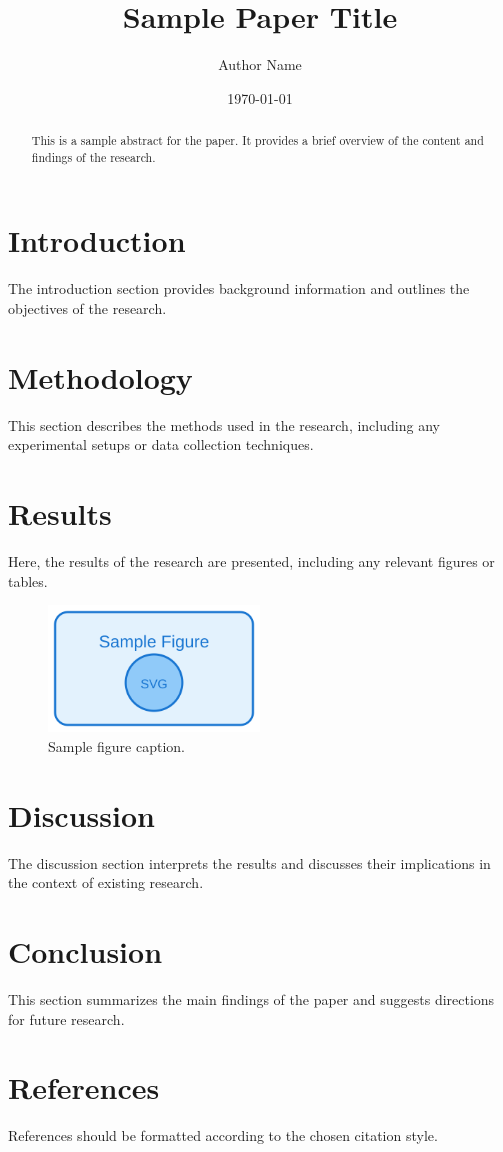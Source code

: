 \documentclass{article}
\title{Sample Paper Title}
\author{Author Name}
\date{\today}
\begin{document}
\maketitle

\begin{abstract}
This is a sample abstract for the paper. It provides a brief overview of the content and findings of the research.
\end{abstract}

\section{Introduction}
The introduction section provides background information and outlines the objectives of the research.

\section{Methodology}
This section describes the methods used in the research, including any experimental setups or data collection techniques.

\section{Results}
Here, the results of the research are presented, including any relevant figures or tables.

\begin{figure}[h]
    \centering
    \includegraphics[width=0.5\textwidth]{../static/img/sample-figure.svg}
    \caption{Sample figure caption.}
    \label{fig:sample}
\end{figure}

\section{Discussion}
The discussion section interprets the results and discusses their implications in the context of existing research.

\section{Conclusion}
This section summarizes the main findings of the paper and suggests directions for future research.

\section*{References}
References should be formatted according to the chosen citation style.
\end{document}

